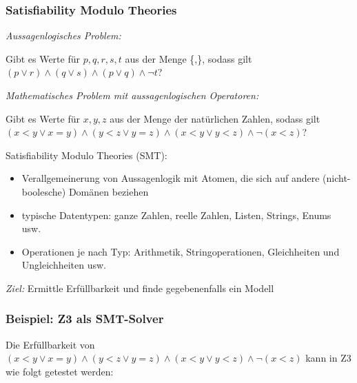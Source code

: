 \documentclass[aspectratio=1610,onlymath]{beamer}
\let\beameroriginaldoublebackslash\\
\let\\=\beameroriginaldoublebackslash
\begin{document}

\begin{frame}\frametitle{Satisfiability Modulo Theories}

\emph{Aussagenlogisches Problem:}
\begin{center}
Gibt es Werte für $p,q,r,s,t$ aus der Menge \{\mytrue,\myfalse\}, sodass gilt\\
$(p \vee r)\wedge (q \vee s)\wedge (p\vee q)\wedge \neg t$?
\end{center}\pause

\emph{Mathematisches Problem mit aussagenlogischen Operatoren:}
\begin{center}
Gibt es Werte für $x,y,z$ aus der Menge der natürlichen Zahlen, sodass gilt\\
$(x<y \vee x=y)\wedge (y<z \vee y=z)\wedge (x<y\vee y<z)\wedge \neg(x<z)$?
\end{center}
\pause

\alert{Satisfiability Modulo Theories (SMT):}
\begin{itemize}
\item Verallgemeinerung von Aussagenlogik mit Atomen, die sich auf andere (nicht-boolesche) Domänen beziehen
\item typische Datentypen: ganze Zahlen, reelle Zahlen, Listen, Strings, Enums usw.
\item Operationen je nach Typ: Arithmetik, Stringoperationen, Gleichheiten und Ungleichheiten usw.
\end{itemize}
\emph{Ziel:} Ermittle Erfüllbarkeit und finde gegebenenfalls ein Modell

\end{frame}

\begin{frame}[fragile]\frametitle{Beispiel: Z3 als SMT-Solver}

Die Erfüllbarkeit von $(x<y \vee x=y)\wedge (y<z \vee y=z)\wedge (x<y\vee y<z)\wedge \neg(x<z)$ kann in Z3 wie folgt getestet werden:
\medskip


\end{frame}
\end{document}
